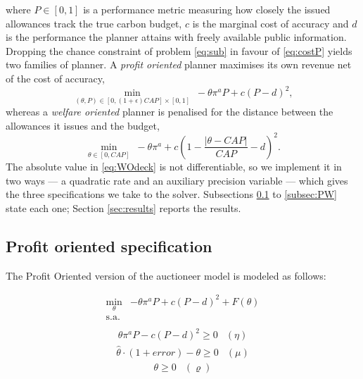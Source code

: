 \documentclass[a4paper,fleqn]{cas-dc}
\begin{document}
where $P\in[0,1]$ is a performance metric measuring how closely the issued allowances track the true carbon budget, $c$ is the marginal cost of accuracy and $d$ is the performance the planner attains with freely available public information. Dropping the chance constraint of problem \eqref{eq:sub} in favour of \eqref{eq:costP} yields two families of planner. A \emph{profit oriented} planner maximises its own revenue net of the cost of accuracy,
\begin{equation}\label{eq:POdeck}
\min_{(\theta,P)\in[0,(1+\epsilon)CAP]\times[0,1]} \; -\theta\pi^a P+c(P-d)^2 ,
\end{equation}
whereas a \emph{welfare oriented} planner is penalised for the distance between the allowances it issues and the budget,
\begin{equation}\label{eq:WOdeck}
\min_{\theta\in[0,CAP]} \; -\theta\pi^a+c\left(1-\frac{|\theta-CAP|}{CAP}-d\right)^2 .
\end{equation}
The absolute value in \eqref{eq:WOdeck} is not differentiable, so we implement it in two ways --- a quadratic rate and an auxiliary precision variable --- which gives the three specifications we take to the solver. Subsections \ref{subsec:PO} to \ref{subsec:PW} state each one; Section \ref{sec:results} reports the results.

\subsection{Profit oriented specification}\label{subsec:PO}

The Profit Oriented version of the auctioneer model is modeled as follows:


\begin{equation}
\begin{array}{rrclcl}
   \displaystyle \min_{\theta} & -\theta \pi^aP + c(P-d)^2+F(\theta) \\\textrm{s.a.} \label{eq:profit2}\\
\end{array}
\end{equation}
\begin{equation}
\begin{array}{cl}
    \theta \pi^a P - c(P-d)^2 \geq 0 & (\eta)  \label{profit2:r1}
\end{array}
\end{equation}
\begin{equation}
\begin{array}{cl}
    \hat{\theta}\cdot(1+error)-\theta \geq 0 & (\mu)  \label{profit2:r2}
\end{array}
\end{equation}
\begin{equation}
\begin{array}{cl}
    \theta \geq 0 & (\varrho)
\end{array}
\end{equation}
\end{document}

